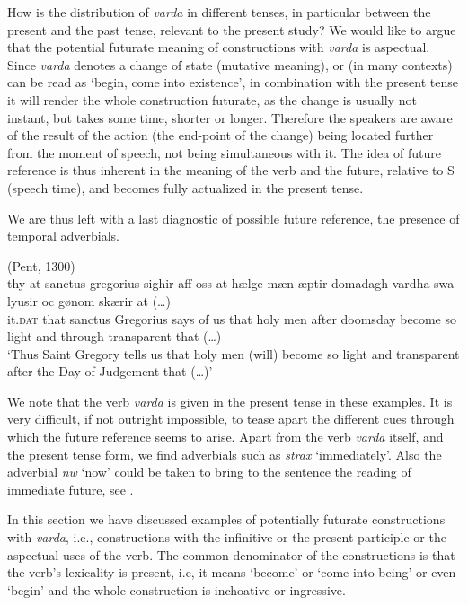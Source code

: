 \documentclass[output=paper,colorlinks,citecolor=brown]{langscibook}
\begin{document}
How is the distribution of \textit{varda} in different tenses, in particular between the present and the past tense, relevant to the present study? We would like to argue that the potential futurate meaning of constructions with \textit{varda} is aspectual. Since \textit{varda} denotes a change of state (mutative meaning), or (in many contexts) can be read as ‘begin, come into existence’, in combination with the present tense it will render the whole construction futurate, as the change is usually not instant, but takes some time, shorter or longer. Therefore the speakers are aware of the result of the action (the end-point of the change) being located further from the moment of speech, not being simultaneous with it. The idea of future reference is thus inherent in the meaning of the verb and the future, relative to S (speech time), and becomes fully actualized in the present tense. 

We are thus left with a last diagnostic of possible future reference, the presence of temporal adverbials.

\largerpage[2]

\ea \label{ex:skrzypek:29}
    (Pent, 1300)\\
    \gll thy at sanctus gregorius sighir aff oss at hælge mæn æptir domadagh vardha swa lyusir oc gønom skærir at (…)\\
    it.\textsc{dat} that sanctus Gregorius says of us that holy men after doomsday become so light and through transparent that (…)\\
    \glt ‘Thus Saint Gregory tells us that holy men (will) become so light and transparent after the Day of Judgement that (…)’
\z


We note that the verb \textit{varda} is given in the present tense in these examples. It is very difficult, if not outright impossible, to tease apart the different cues through which the future reference seems to arise. Apart from the verb \textit{varda} itself, and the present tense form, we find adverbials such as \textit{strax} ‘immediately’. Also the adverbial \textit{nw} ‘now’ could be taken to bring to the sentence the reading of immediate future, see . 

In this section we have discussed examples of potentially futurate constructions with \textit{varda}, i.e., constructions with the infinitive or the present participle or the aspectual uses of the verb. The common denominator of the constructions is that the verb’s lexicality is present, i.e, it means ‘become’ or ‘come into being’ or even ‘begin’ and the whole construction is inchoative or ingressive. 
\end{document}
